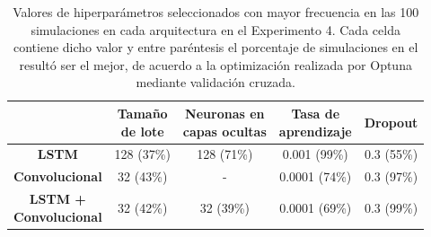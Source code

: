 \documentclass[../../main.tex]{subfiles}
\begin{document}
\begin{table}[H]
    \centering
    \renewcommand{\arraystretch}{1.2}
    \begin{tabular}{|c|c|c|c|c|}
        \hline
            & \makecell{\textbf{Tamaño}\\\textbf{de lote}}
            & \makecell{\textbf{Neuronas en}\\\textbf{capas ocultas}}
            & \makecell{\textbf{Tasa de}\\\textbf{aprendizaje}}
            & \textbf{Dropout} \\ \hline\hline
        \textbf{LSTM}
            & 128 (37\%) & 128 (71\%) & 0.001 (99\%)  & 0.3 (55\%) \\ \hline
        \textbf{Convolucional}
            & 32 (43\%) & -           & 0.0001 (74\%) & 0.3 (97\%) \\ \hline
        \makecell{\textbf{LSTM +}\\\textbf{Convolucional}}
            & 32 (42\%) & 32 (39\%)   & 0.0001 (69\%) & 0.3 (99\%) \\
        \hline
    \end{tabular}
    \caption{Valores de hiperparámetros seleccionados con mayor frecuencia en las 100
    simulaciones en cada arquitectura en el Experimento 4. Cada celda contiene dicho valor
    y entre paréntesis el porcentaje de simulaciones en el resultó ser el mejor, de
    acuerdo a la optimización realizada por Optuna mediante validación cruzada.}
    \label{tab:hyperparams_exp4}
\end{table}
\end{document}
